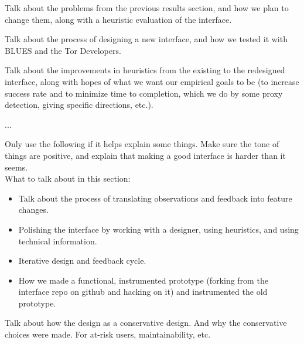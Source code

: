 \documentclass{template}
\begin{document}
{\color {red} 
Talk about the problems from the previous results section, and how we plan to change them,
along with a heuristic evaluation of the interface. 

Talk about the process of designing a new interface, and how we tested it with BLUES and the
Tor Developers. 

Talk about the improvements in heuristics from the existing to the redesigned interface, along 
with hopes of what we want our empirical goals to be (to increase success rate and to minimize
time to completion, which we do by some proxy detection, giving specific directions, etc.). 

...

Only use the following if it helps explain some things. Make sure the tone of things are positive, and explain that making a good interface is harder than it seems.\\

%


What to talk about in this section: 
\begin{itemize} \itemsep1pt \parskip0pt  
\item Talk about the process of translating observations and feedback into feature changes. 
\item Polishing the interface by working with a designer, using heuristics, and using technical information. 
\item Iterative design and feedback cycle. 
\item How we made a functional, instrumented prototype (forking from the interface repo on github and hacking on it) and instrumented the old prototype. 
\end{itemize} 

Talk about how the design as a conservative design. And why the conservative choices were made. For at-risk users, maintainability, etc.
}
\end{document}
